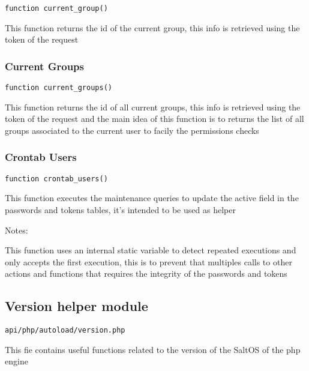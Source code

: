 \documentclass[a4paper]{article}
\begin{document}
\begin{lstlisting}
function current_group()
\end{lstlisting}

This function returns the id of the current group, this info is retrieved
using the token of the request

\hypertarget{toc266}{}
\subsubsection{Current Groups}

\begin{lstlisting}
function current_groups()
\end{lstlisting}

This function returns the id of all current groups, this info is retrieved
using the token of the request and the main idea of this function is to
returns the list of all groups associated to the current user to facily the
permissions checks

\hypertarget{toc267}{}
\subsubsection{Crontab Users}

\begin{lstlisting}
function crontab_users()
\end{lstlisting}

This function executes the maintenance queries to update the active field
in the passwords and tokens tables, it's intended to be used as helper

Notes:

This function uses an internal static variable to detect repeated executions
and only accepts the first execution, this is to prevent that multiples calls
to other actions and functions that requires the integrity of the passwords
and tokens

\hypertarget{toc268}{}
\subsection{Version helper module}

\begin{lstlisting}
api/php/autoload/version.php
\end{lstlisting}

This fie contains useful functions related to the version of the SaltOS of the php engine

\hypertarget{toc269}{}
\end{document}
